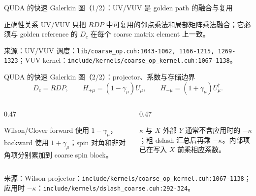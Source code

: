 \documentclass[UTF8,aspectratio=169,11pt]{ctexbeamer}
\newcommand{\source}[1]{\vspace{0.05em}\par{\raggedright\scriptsize\color{muted}来源：#1\par}}
\newcommand{\codepath}[1]{\nolinkurl{#1}}
\begin{document}
\begin{frame}[t]{QUDA 的快速 Galerkin 图（1/2）：UV/VUV 是 golden path 的融合与复用}
  \centering
  \vspace{0.16cm}
  \begin{block}{正确性关系}
    UV/VUV 只把 \(RDP\) 中可复用的邻点乘法和局部矩阵乘法融合；它必须与 golden reference 的 \(D_c\) 在每个 coarse matrix element 上一致。
  \end{block}
  \source{UV/VUV 调度：\codepath{lib/coarse_op.cuh:1043-1062, 1166-1215, 1269-1323}；VUV kernel：\codepath{include/kernels/coarse_op_kernel.cuh:1067-1138}。}
\end{frame}

\begin{frame}[t]{QUDA 的快速 Galerkin 图（2/2）：projector、系数与存储边界}
  \begin{equation*}
    D_c=RDP,\qquad
    H_{+\mu}=(1-\gamma_\mu)U_\mu,\qquad
    H_{-\mu}=(1+\gamma_\mu)U_\mu^\dagger .
  \end{equation*}
  \begin{columns}[T,totalwidth=\textwidth]
    \begin{column}{0.47\textwidth}
      \begin{block}{Wilson/Clover}
        forward 使用 \(1-\gamma_\mu\)，backward 使用 \(1+\gamma_\mu\)；spin 对角和非对角项分别累加到 coarse spin block。
      \end{block}
    \end{column}
    \begin{column}{0.47\textwidth}
      \begin{alertblock}{\(\kappa\) 与 \(X\)}
        外部 \(Y\) 通常不含应用时的 \(-\kappa\)；粗 dslash 汇总后再乘 \(-\kappa\)。内部项已在写入 \(X\) 前乘相应系数。
      \end{alertblock}
    \end{column}
  \end{columns}
  \source{Wilson projector：\codepath{include/kernels/coarse_op_kernel.cuh:1067-1138}；应用时 \(-\kappa\)：\codepath{include/kernels/dslash_coarse.cuh:292-324}。}
\end{frame}
\end{document}
